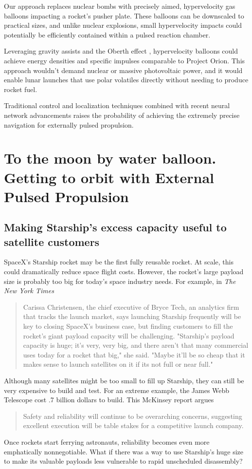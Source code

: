 \documentclass{article}
\begin{document}
Our approach replaces nuclear bombs with precisely aimed, hypervelocity gas balloons impacting a rocket's pusher plate. These balloons can be downscaled to practical sizes, and unlike nuclear explosions, small hypervelocity impacts could potentially be efficiently contained within a pulsed reaction chamber.

Leveraging gravity assists and the Oberth effect \cite{oberth_effect}, hypervelocity balloons could achieve energy densities and specific impulses comparable to Project Orion. This approach wouldn't demand nuclear or massive photovoltaic power, and it would enable lunar launches that use polar volatiles directly without needing to produce rocket fuel.     

Traditional control and localization techniques combined with recent neural network advancements raises the probability of achieving the extremely precise navigation for externally pulsed propulsion.

\section{To the moon by water balloon.  Getting to orbit with External Pulsed Propulsion}
\subsection{Making Starship's excess capacity useful to satellite customers}
SpaceX's Starship \cite{starship} rocket may be the first fully reusable rocket. At scale, this could dramatically reduce space flight costs.   However, the rocket's large payload size is probably too big for today's space industry needs. For example, in \textit{The New York Times}
\begin{quote}
Carissa Christensen, the chief executive of Bryce Tech, an analytics firm that tracks the launch market, says launching Starship frequently will be key to closing SpaceX’s business case, but finding customers to fill the rocket’s giant payload capacity will be challenging. 
"Starship's payload capacity is huge; it's very, very big, and there aren't that many commercial uses today for a rocket that big," she said.  "Maybe it'll be so cheap that it makes sense to launch satellites on it if its not full or near full."  \cite{nyt_starship_size}
\end{quote}
Although many satellites might be too small to fill up Starship, they can still be very expensive to build and test. For an extreme example, the James Webb Telescope \cite{james_webb_space_telescope} cost \9.7 billion dollars \cite{jwst_cost} to build. This McKinsey report argues 
\begin{quote}
Safety and reliability will continue to be overarching concerns, suggesting excellent execution will be table stakes for a competitive launch company. \cite{mckinsey_reliability}
\end{quote}
Once rockets start ferrying astronauts, reliability becomes even more emphatically nonnegotiable. What if there was a way to use Starship's huge size to make its valuable payloads less vulnerable to rapid unscheduled disassembly? 


  
  
\end{document}
